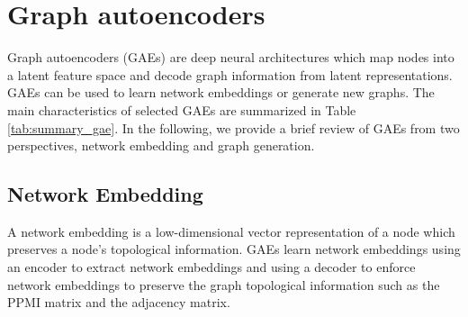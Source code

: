 	
	
	\section{Graph autoencoders}
	\label{sec:genden}
	Graph autoencoders (GAEs) are deep neural architectures which map nodes into a latent feature space and decode graph information from  latent representations. GAEs can be used to learn network embeddings or generate new graphs. The main characteristics of selected GAEs are summarized in Table \ref{tab:summary_gae}. In the following, we provide a brief review of GAEs from two perspectives, network embedding and graph generation. 
	
	\subsection{Network Embedding}
	A network embedding is a low-dimensional vector representation of a node which preserves a node's topological information.  GAEs learn network embeddings using an encoder to extract network embeddings and using a decoder to enforce network embeddings to preserve the graph topological information such as the PPMI matrix and the adjacency matrix.
	
